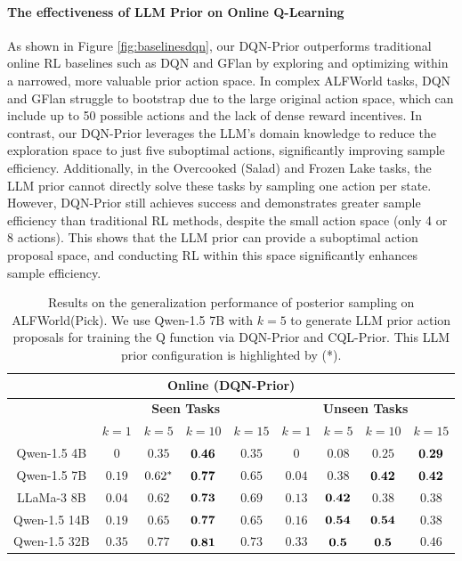 \documentclass{article} %
\theoremstyle{plain}
\theoremstyle{definition}
\theoremstyle{remark}
\begin{document}
{\paragraph{The effectiveness of LLM Prior on Online Q-Learning}
As shown in Figure \ref{fig:baselinesdqn}, our DQN-Prior outperforms traditional online RL baselines such as DQN and GFlan by exploring and optimizing within a narrowed, more valuable prior action space. In complex ALFWorld tasks, DQN and GFlan struggle to bootstrap due to the large original action space, which can include up to 50 possible actions and the lack of dense reward incentives. In contrast, our DQN-Prior leverages the LLM's domain knowledge to reduce the exploration space to just five suboptimal actions, significantly improving sample efficiency. Additionally, in the Overcooked (Salad) and Frozen Lake tasks, the LLM prior cannot directly solve these tasks by sampling one action per state. However, DQN-Prior still achieves success and demonstrates greater sample efficiency than traditional RL methods, despite the small action space (only 4 or 8 actions). This shows that the LLM prior can provide a suboptimal action proposal space, and conducting RL within this space significantly enhances sample efficiency.
\begin{table}[]
    \caption{Results on the generalization performance of posterior sampling on ALFWorld(Pick). We use Qwen-1.5 7B with $k=5$ to generate LLM prior action proposals for training the Q function via DQN-Prior and CQL-Prior. This LLM prior configuration is highlighted by (*).}
    \centering
    \begin{tabular}{c|cccc|cccc}
    \hline
    \multicolumn{9}{c}{\textbf{Online (DQN-Prior)}}\\
    \hline
    \hline
         & \multicolumn{4}{c|}{\textbf{Seen Tasks}} & \multicolumn{4}{c}{\textbf{Unseen Tasks}} \\
        \hline
        \hline
        & $k=1$&$k=5$ &$k=10$&$k=15$&$k=1$&$k=5$&$k=10$&$k=15$\\
         \hline
         Qwen-1.5 4B&$0$&$0.35$&$\bf 0.46$&$0.35$&$0$&$0.08$&$0.25$&$\bf0.29$\\
         Qwen-1.5 7B&$0.19$&$0.62^{\bf{*}}$& $\bf0.77$&$0.65$&$0.04$&$0.38$&$\bf 0.42$&$\bf 0.42$\\
         LLaMa-3 8B &$0.04$&$0.62$&$\bf0.73$&$0.69$&$0.13$&$\bf 0.42$&$0.38$&$0.38$\\
         Qwen-1.5 14B&$0.19$&$0.65$& $\bf0.77$&$0.65$&$0.16$&$\bf 0.54$&$\bf 0.54$&$0.38$\\
         Qwen-1.5 32B&$0.35$&$0.77$&$\bf0.81$&$0.73$&$0.33$&$\bf 0.5$&$\bf 0.5$&$0.46$\\
         

\end{tabular}
\end{table}}
\end{document}

